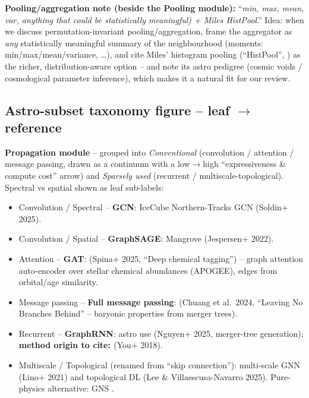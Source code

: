 \textbf{Pooling/aggregation note (beside the Pooling module):} ``\emph{min,
max, mean, var, anything that could be statistically meaningful) + Miles
HistPool}.'' Idea: when we discuss permutation-invariant pooling/aggregation,
frame the aggregator as \emph{any} statistically meaningful summary of the
neighbourhood (moments: min/max/mean/variance, \ldots), and cite Miles'
histogram pooling (``HistPool'', \citep{Cranmer2021_histpool_deepsets}) as the richer,
distribution-aware option -- and note its astro pedigree (cosmic voids /
cosmological parameter inference), which makes it a natural fit for our review.


\subsection*{Astro-subset taxonomy figure -- leaf $\to$ reference}

\textbf{Propagation module} -- grouped into \emph{Conventional} (convolution /
attention / message passing, drawn as a continuum with a low$\to$high
``expressiveness \& compute cost'' arrow) and \emph{Sparsely used} (recurrent /
multiscale-topological). Spectral vs spatial shown as leaf sub-labels:
\begin{itemize}
    \item Convolution / Spectral -- \textbf{GCN}: \citep{Soldin2025_IceCube_GCN}
        IceCube Northern-Tracks GCN (Soldin+ 2025).
    \item Convolution / Spatial -- \textbf{GraphSAGE}: Mangrove
        \citep{Jespersen2022_mangrove} (Jespersen+ 2022).
    \item Attention -- \textbf{GAT}: \citep{Spina2025_chemicaltagging_GAT} (Spina+ 2025,
        ``Deep chemical tagging'') -- graph attention auto-encoder over stellar
        chemical abundances (APOGEE), edges from orbital/age similarity.
    \item Message passing -- \textbf{Full message passing}:
        \citep{Chuang2024_mergertree_GNN} (Chuang et al.\ 2024, ``Leaving No Branches
        Behind'' -- baryonic properties from merger trees).
    \item Recurrent -- \textbf{GraphRNN}: astro use
        \citep{Nguyen2025_mergertree_generative} (Nguyen+ 2025, merger-tree generation);
        \textbf{method origin to cite: \citep{You2018_graphrnn_generative}} (You+ 2018).
    \item Multiscale / Topological (renamed from ``skip connection''):
        multi-scale GNN \citep{Lino2021_multiscale_continuum} (Lino+ 2021) and
        topological DL \citep{Lee2025_topological_cosmology} (Lee \& Villaescusa-Navarro
        2025). Pure-physics alternative: GNS \citep{SanchezGonzalez2020_GNS_physics}.
\end{itemize}

